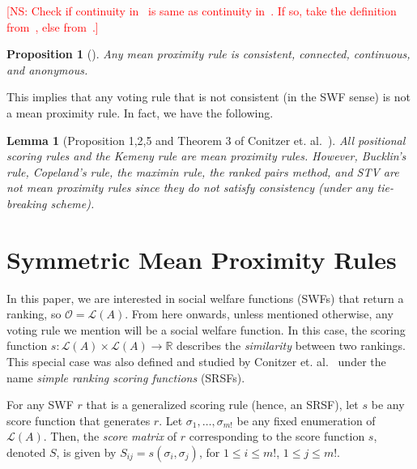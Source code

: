 \documentclass[10pt,letterpaper]{article}
\newcommand{\calL}{{\mathcal{L}}}
\newcommand{\rank}{{\calL(A)}}
\newcommand{\calO}{{\mathcal{O}}}
\newtheorem{lemma}{Lemma}
\newtheorem{proposition}{Proposition}
\newenvironment{definition}[1][Definition]{\begin{trivlist}
\item[\hskip \labelsep {\bfseries #1}]}{\end{trivlist}}
\newcommand{\kibitz}[2]{\ifnum\Comments=1\textcolor{#1}{#2}\fi}
\newcommand{\cns}[1]{\kibitz{red} {[NS: #1]}}
\begin{document}
\cns{Check if continuity in~\cite{CRX09} is same as continuity in~\cite{Zwicker08a}. If so, take the definition from~\cite{Zwicker08a}, else from~\cite{CRX09}.}
\begin{proposition}[\cite{Zwicker08b}]
Any mean proximity rule is consistent, connected, continuous, and anonymous.
\label{prop:properties}
\end{proposition}

This implies that any voting rule that is not consistent (in the SWF sense) is not a mean proximity rule. In fact, we have the following.

\begin{lemma}[Proposition 1,2,5 and Theorem 3 of Conitzer et. al.~\cite{CRX09}]
All positional scoring rules and the Kemeny rule are mean proximity rules. However, Bucklin's rule, Copeland's rule, the maximin rule, the ranked pairs method, and STV are not mean proximity rules since they do not satisfy consistency (under any tie-breaking scheme). 
\end{lemma}


\section{Symmetric Mean Proximity Rules}

In this paper, we are interested in social welfare functions (SWFs) that return a ranking, so $\calO = \rank$. From here onwards, unless mentioned otherwise, any voting rule we mention will be a social welfare function. In this case, the scoring function $s : \rank \times \rank \rightarrow \mathbb{R}$ describes the \emph{similarity} between two rankings. This special case was also defined and studied by Conitzer et. al.~\cite{CRX09} under the name \emph{simple ranking scoring functions} (SRSFs). 

\begin{definition}[Score Matrix]
For any SWF $r$ that is a generalized scoring rule (hence, an SRSF), let $s$ be any score function that generates $r$. Let $\sigma_1,\ldots,\sigma_{m!}$ be any fixed enumeration of $\rank$. Then, the \emph{score matrix} of $r$ corresponding to the score function $s$, denoted $S$, is given by $S_{ij} = s(\sigma_i,\sigma_j)$, for $1 \le i \le m!$, $1 \le j \le m!$. 
\end{definition}
\end{document}
